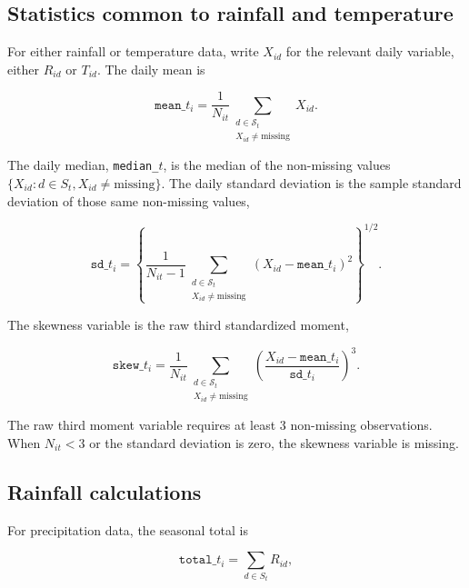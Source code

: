 \subsection{Statistics common to rainfall and temperature}

For either rainfall or temperature data, write $X_{id}$ for the relevant daily variable, either $R_{id}$ or $T_{id}$. The daily mean is

\begin{equation}
	\texttt{mean\_} t_i = \frac{1}{N_{it}} \sum_{\substack{d \in \mathcal{S}_{t} \\ X_{id} \neq \text{missing}}} X_{id}.
\end{equation}

The daily median, \texttt{median\_}$t$, is the median of the non-missing values $\{X_{id} : d \in S_t, X_{id} \neq \text{missing}\}$. The daily standard deviation is the sample standard deviation of those same non-missing values,

\begin{equation}
	\texttt{sd\_} t_i = \left\{\frac{1}{N_{it} - 1} \sum_{\substack{d \in \mathcal{S}_{t} \\ X_{id} \neq \text{missing}}} \left(X_{id} - \texttt{mean\_} t_i \right)^2 \right\}^{1 / 2} .
\end{equation}

The skewness variable is the raw third standardized moment,

\begin{equation}
	\texttt{skew\_} t_i = \frac{1}{N_{it}} \sum_{\substack{d \in \mathcal{S}_{t} \\ X_{id} \neq \text{missing}}} \left( \frac{X_{id} - \texttt{mean\_} t_i}{\texttt{sd\_} t_i} \right)^3 .
\end{equation}

\noindent The raw third moment variable requires at least 3 non-missing observations. When $N_{it} < 3$ or the standard deviation is zero, the skewness variable is missing.

\subsection{Rainfall calculations}

For precipitation data, the seasonal total is

\begin{equation}
	\texttt{total\_} t_i = \sum_{d \in S_t} R_{id},
\end{equation}

